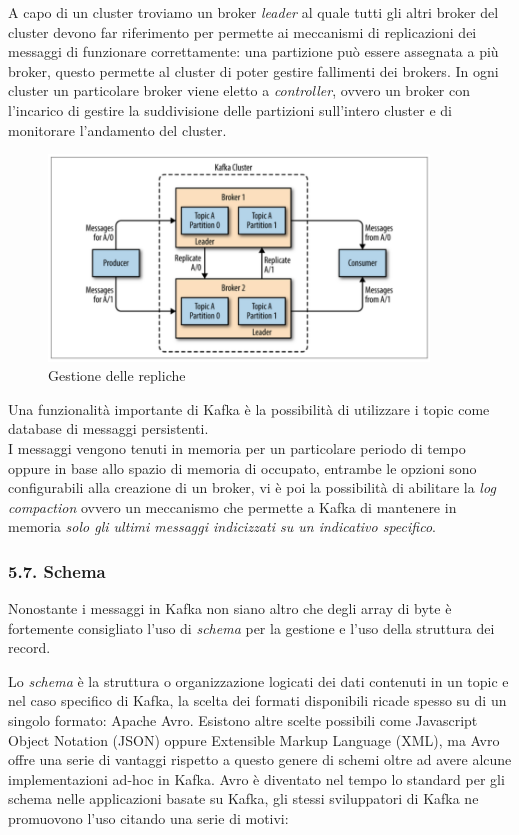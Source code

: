 \documentclass[]{article}
\begin{document}
A capo di un cluster troviamo un broker \emph{leader} al quale tutti gli
altri broker del cluster devono far riferimento per permette ai
meccanismi di replicazioni dei messaggi di funzionare correttamente: una
partizione può essere assegnata a più broker, questo permette al cluster
di poter gestire fallimenti dei brokers. In ogni cluster un particolare
broker viene eletto a \emph{controller}, ovvero un broker con l'incarico
di gestire la suddivisione delle partizioni sull'intero cluster e di
monitorare l'andamento del cluster.

\begin{figure}
\centering
\includegraphics[width=0.90000\textwidth]{../images/partition-replica.png}
\caption{Gestione delle repliche \label{figure_5}}
\end{figure}

Una funzionalità importante di Kafka è la possibilità di utilizzare i
topic come database di messaggi persistenti.\\
I messaggi vengono tenuti in memoria per un particolare periodo di tempo
oppure in base allo spazio di memoria di occupato, entrambe le opzioni
sono configurabili alla creazione di un broker, vi è poi la possibilità
di abilitare la \emph{log compaction} ovvero un meccanismo che permette
a Kafka di mantenere in memoria \emph{solo gli ultimi messaggi
indicizzati su un indicativo specifico}.

\newpage

\subsubsection{5.7. Schema}\label{schema}

Nonostante i messaggi in Kafka non siano altro che degli array di byte è
fortemente consigliato l'uso di \emph{schema} per la gestione e l'uso
della struttura dei record.

Lo \emph{schema} è la struttura o organizzazione logicati dei dati
contenuti in un topic e nel caso specifico di Kafka, la scelta dei
formati disponibili ricade spesso su di un singolo formato: Apache Avro.
Esistono altre scelte possibili come Javascript Object Notation (JSON)
oppure Extensible Markup Language (XML), ma Avro offre una serie di
vantaggi rispetto a questo genere di schemi oltre ad avere alcune
implementazioni ad-hoc in Kafka. Avro è diventato nel tempo lo standard
per gli schema nelle applicazioni basate su Kafka, gli stessi
sviluppatori di Kafka ne promuovono l'uso citando una serie di motivi:
\end{document}
